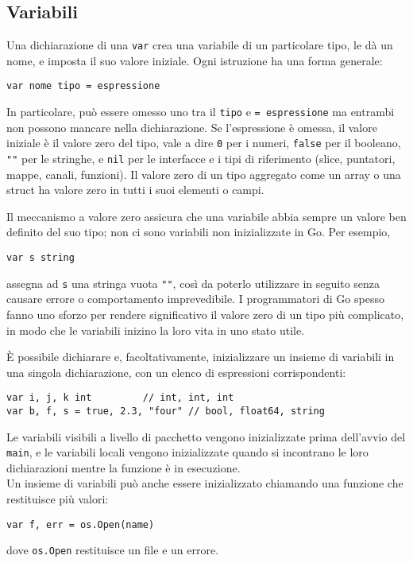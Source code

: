 \documentclass[../../thesis.tex]{subfiles}
\begin{document}
    \subsection{Variabili}\label{subsec:variabili}
    Una dichiarazione di una \verb"var" crea una variabile di un particolare tipo, le dà un nome, e imposta il suo valore iniziale.
    Ogni istruzione ha una forma generale:
    \begin{lstlisting}[label={lst:lstlisting1-3.1}]
var nome tipo = espressione
    \end{lstlisting}
    In particolare, può essere omesso uno tra il \verb"tipo" e \verb"= espressione" ma entrambi non possono mancare nella dichiarazione.
    Se l'espressione è omessa, il valore iniziale è il valore zero del tipo, vale a dire \verb"0" per i numeri, \verb"false" per il booleano, \verb|""| per le stringhe, e \verb"nil" per le interfacce e i tipi di riferimento (slice, puntatori, mappe, canali, funzioni).
    Il valore zero di un tipo aggregato come un array o una struct ha valore zero in tutti i suoi elementi o campi.
    \hfill \vspace{12pt}

    Il meccanismo a valore zero assicura che una variabile abbia sempre un valore ben definito del suo tipo;
    non ci sono variabili non inizializzate in Go. Per esempio,
    \begin{lstlisting}[frame = single,label={lst:lstlisting1-3.2}]
var s string
    \end{lstlisting}
    assegna ad \verb"s" una stringa vuota \verb|""|, così da poterlo utilizzare in seguito senza causare errore o comportamento imprevedibile.
    I programmatori di Go spesso fanno uno sforzo per rendere significativo il valore zero di un tipo più complicato, in modo che le variabili inizino la loro vita in uno stato utile.
    \hfill \vspace{12pt}

    È possibile dichiarare e, facoltativamente, inizializzare un insieme di variabili in una singola dichiarazione, con un elenco di espressioni corrispondenti:
    \begin{lstlisting}[frame = single,label={lst:lstlisting1-3.3}]
var i, j, k int			// int, int, int
var b, f, s = true, 2.3, "four"	// bool, float64, string
    \end{lstlisting}
    Le variabili visibili a livello di pacchetto vengono inizializzate prima dell'avvio del \verb"main", e le variabili locali vengono inizializzate quando si incontrano le loro dichiarazioni mentre la funzione è in esecuzione.\\
    Un insieme di variabili può anche essere inizializzato chiamando una funzione che restituisce più valori:
    \begin{lstlisting}[frame = single,label={lst:lstlisting1-3.4}]
var f, err = os.Open(name)
    \end{lstlisting}
    dove \verb"os.Open" restituisce un file e un errore.
    
    
    
    
\end{document}
